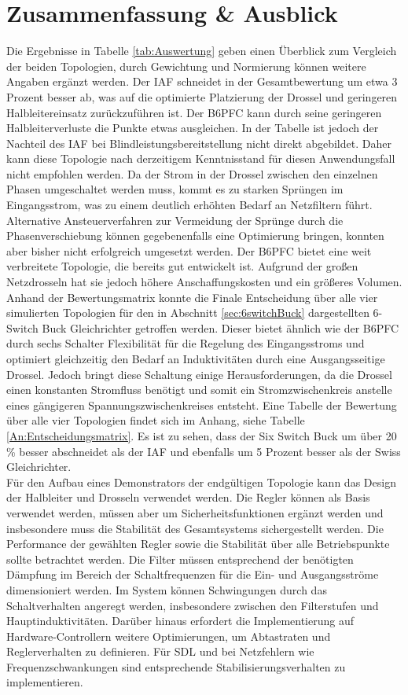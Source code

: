 \chapter{Zusammenfassung \& Ausblick}
Die Ergebnisse in Tabelle \ref{tab:Auswertung} geben einen Überblick zum Vergleich der beiden Topologien, durch Gewichtung und Normierung können weitere Angaben ergänzt werden. Der \gls{IAF} schneidet in der Gesamtbewertung um etwa 3 Prozent besser ab, was auf die optimierte Platzierung der Drossel und geringeren Halbleitereinsatz zurückzuführen ist. Der \gls{B6PFC} kann durch seine geringeren Halbleiterverluste die Punkte etwas ausgleichen. In der Tabelle ist jedoch der Nachteil des \gls{IAF} bei Blindleistungsbereitstellung nicht direkt abgebildet. Daher kann diese Topologie nach derzeitigem Kenntnisstand für diesen Anwendungsfall nicht empfohlen werden. Da der Strom in der Drossel zwischen den einzelnen Phasen umgeschaltet werden muss, kommt es zu starken Sprüngen im Eingangsstrom, was zu einem deutlich erhöhten Bedarf an Netzfiltern führt. Alternative Ansteuerverfahren zur Vermeidung der Sprünge durch die Phasenverschiebung können gegebenenfalls eine Optimierung bringen, konnten aber bisher nicht erfolgreich umgesetzt werden. Der \gls{B6PFC} bietet eine weit verbreitete Topologie, die bereits gut entwickelt ist. Aufgrund der großen Netzdrosseln hat sie jedoch höhere Anschaffungskosten und ein größeres Volumen. \\ 
Anhand der Bewertungsmatrix konnte die Finale Entscheidung über alle vier simulierten Topologien für den in Abschnitt \ref{sec:6switchBuck} dargestellten 6-Switch Buck Gleichrichter getroffen werden. Dieser bietet ähnlich wie der \gls{B6PFC} durch sechs Schalter Flexibilität für die Regelung des Eingangsstroms und optimiert gleichzeitig den Bedarf an Induktivitäten durch eine Ausgangsseitige Drossel. Jedoch bringt diese Schaltung einige Herausforderungen, da die Drossel einen konstanten Stromfluss benötigt und somit ein Stromzwischenkreis anstelle eines gängigeren Spannungszwischenkreises entsteht. Eine Tabelle der Bewertung über alle vier Topologien findet sich im Anhang, siehe Tabelle \ref{An:Entscheidungsmatrix}. Es ist zu sehen, dass der Six Switch Buck um über 20 \% besser abschneidet als der \gls{IAF} und ebenfalls um 5 Prozent besser als der Swiss Gleichrichter. \\
Für den Aufbau eines Demonstrators der endgültigen Topologie kann das Design der Halbleiter und Drosseln verwendet werden. Die Regler können als Basis verwendet werden, müssen aber um Sicherheitsfunktionen ergänzt werden und insbesondere muss die Stabilität des Gesamtsystems sichergestellt werden. Die Performance der gewählten Regler sowie die Stabilität über alle Betriebspunkte sollte betrachtet werden. Die Filter müssen entsprechend der benötigten Dämpfung im Bereich der Schaltfrequenzen für die Ein- und Ausgangsströme dimensioniert werden. Im System können Schwingungen durch das Schaltverhalten angeregt werden, insbesondere zwischen den Filterstufen und Hauptinduktivitäten. Darüber hinaus erfordert die Implementierung auf Hardware-Controllern weitere Optimierungen, um Abtastraten und Reglerverhalten zu definieren. Für \gls{SDL} und bei Netzfehlern wie Frequenzschwankungen sind entsprechende Stabilisierungsverhalten zu implementieren.\\
